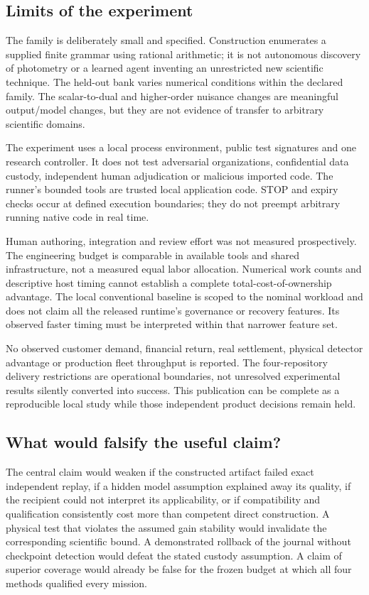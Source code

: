 \documentclass[11pt]{article}
\begin{document}
\subsection{Limits of the experiment}

The family is deliberately small and specified. Construction enumerates a supplied finite grammar using rational arithmetic; it is not autonomous discovery of photometry or a learned agent inventing an unrestricted new scientific technique. The held-out bank varies numerical conditions within the declared family. The scalar-to-dual and higher-order nuisance changes are meaningful output/model changes, but they are not evidence of transfer to arbitrary scientific domains.

The experiment uses a local process environment, public test signatures and one research controller. It does not test adversarial organizations, confidential data custody, independent human adjudication or malicious imported code. The runner's bounded tools are trusted local application code. STOP and expiry checks occur at defined execution boundaries; they do not preempt arbitrary running native code in real time.

Human authoring, integration and review effort was not measured prospectively. The engineering budget is comparable in available tools and shared infrastructure, not a measured equal labor allocation. Numerical work counts and descriptive host timing cannot establish a complete total-cost-of-ownership advantage. The local conventional baseline is scoped to the nominal workload and does not claim all the released runtime's governance or recovery features. Its observed faster timing must be interpreted within that narrower feature set.

No observed customer demand, financial return, real settlement, physical detector advantage or production fleet throughput is reported. The four-repository delivery restrictions are operational boundaries, not unresolved experimental results silently converted into success. This publication can be complete as a reproducible local study while those independent product decisions remain held.

\subsection{What would falsify the useful claim?}

The central claim would weaken if the constructed artifact failed exact independent replay, if a hidden model assumption explained away its quality, if the recipient could not interpret its applicability, or if compatibility and qualification consistently cost more than competent direct construction. A physical test that violates the assumed gain stability would invalidate the corresponding scientific bound. A demonstrated rollback of the journal without checkpoint detection would defeat the stated custody assumption. A claim of superior coverage would already be false for the frozen budget at which all four methods qualified every mission.
\end{document}
